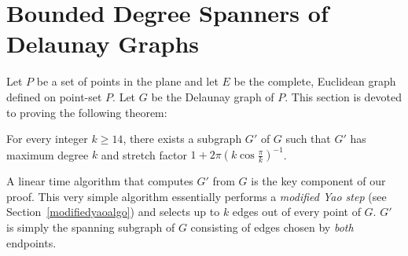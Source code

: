 \documentclass{stacs_proc}
\theoremstyle{plain}\newtheorem{satz}[thm]{Satz}
\begin{document}
\section{Bounded Degree Spanners of Delaunay Graphs}
\label{euclidean} 

Let $P$ be a set of points in the plane and let $E$
be the complete, Euclidean graph defined on point-set $P$. Let $G$ be the
Delaunay graph of $P$. This section is devoted to proving the following
theorem:

\begin{theorem}
\label{maintheorem} For every integer $k \geq 14$, there exists a
subgraph $G'$ of $G$ such that $G'$ has maximum degree $k$ and
stretch factor $1+2\pi(k\cos{\frac{\pi}{k}})^{-1}$.
\end{theorem}

A linear time algorithm that computes $G'$ from $G$ is the key
component of our proof. This very simple algorithm essentially
performs a {\em modified Yao step} (see
Section~\ref{modifiedyaoalgo}) and selects up to $k$ edges out of
every point of $G$. $G'$ is simply the spanning subgraph of $G$ consisting
of edges chosen by {\em both} endpoints.
\end{document}
